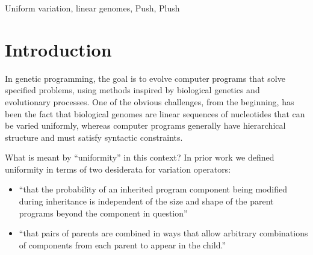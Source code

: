 \documentclass[graybox]{svmult}
\begin{document}

\begin{keywords}
Uniform variation, linear genomes, Push, Plush
\end{keywords}

\section{Introduction}
\label{Introduction}

In genetic programming, the goal is to evolve computer programs that solve specified problems, using methods inspired by biological genetics and evolutionary processes.
One of the obvious challenges, from the beginning, has been the fact that biological genomes are linear sequences of nucleotides that can be varied uniformly, whereas computer programs generally have hierarchical structure and must satisfy syntactic constraints.

What is meant by ``uniformity'' in this context? In prior work \cite{Spector:2013:GPTP} we defined uniformity in terms of two desiderata for variation operators:

\begin{itemize}
\item ``that the probability of an inherited program component being modified during inheritance is independent of the size and shape of the parent programs beyond the component in question'' 
\item ``that pairs of parents are combined in ways that allow arbitrary combinations of components from each parent to appear in the child.''
\end{itemize}
\end{document}
